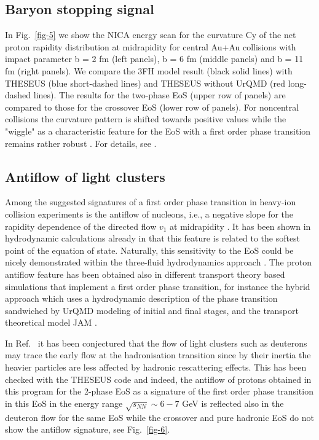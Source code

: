 \documentclass{webofc}
\begin{document}
\subsection{Baryon stopping signal}


In Fig.~\ref{fig-5} we show the NICA energy scan for the curvature Cy of the net proton rapidity distribution at midrapidity for central Au+Au collisions with impact parameter b = 2 fm (left panels), b = 6 fm (middle panels) and b = 11 fm (right panels). 
We compare the 3FH model result (black solid lines) with THESEUS (blue short-dashed lines) and THESEUS without UrQMD (red long-dashed lines). 
The results for the two-phase EoS (upper row of panels) are compared to those for the
crossover EoS (lower row of panels). 
For noncentral collisions the curvature pattern is shifted towards positive values while the
"wiggle" as a characteristic feature for the EoS with a first order phase transition 
\cite{Ivanov:2010cu,Ivanov:2013wha} remains rather robust \cite{Ivanov:2015vna,Ivanov:2016xev}. 
For details, see \cite{2}. 


\subsection{Antiflow of light clusters}

Among the suggested signatures of a first order phase transition in heavy-ion collision experiments is the antiflow of nucleons, i.e., a negative slope for the rapidity dependence of the directed flow $v_1$ at midrapidity \cite{Stoecker:2004qu}. It has been shown in hydrodynamic calculations already in \cite{Brachmann:1999xt} that this feature is related to the softest point of the equation of state. 
Naturally, this sensitivity to the EoS could be nicely demonstrated within the three-fluid hydrodynamics approach \cite{Ivanov:2014ioa,Ivanov:2016sqy}.
The proton antiflow feature has been obtained also in different transport theory based simulations that implement a first order phase transition, for instance the hybrid approach \cite{Steinheimer:2014pfa}
which uses a hydrodynamic description of the phase transition sandwiched by UrQMD modeling of initial and final stages, and the transport theoretical model JAM \cite{Nara:2016phs,Nara:2016hbg}.

In Ref.~\cite{4} it has been conjectured that the flow of light clusters such as deuterons may trace the early flow at the hadronisation transition since by their inertia the heavier particles are less affected by hadronic rescattering effects. This has been checked with the THESEUS code and indeed, the antiflow of protons 
obtained in this program for the 2-phase EoS as a signature of the first order phase transition in this EoS 
in the energy range $\sqrt{s_{NN}}\sim 6-7$ GeV is reflected also in the deuteron flow for the same EoS while the crossover and pure hadronic EoS do not show the antiflow signature, see Fig.~\ref{fig-6}.
\end{document}
